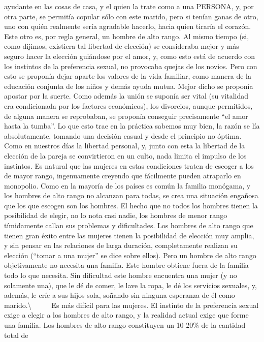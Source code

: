 ayudante en las cosas de casa, y el quien la trate como a una PERSONA,
y, por otra parte, se permitía copular sólo con este marido, pero si
tenían ganas de otro, uno con quién realmente sería agradable hacerlo,
hacia quien tiraría el corazón. Este otro es, por regla general, un
hombre de alto rango. Al mismo tiempo (si, como dijimos, existiera tal
libertad de elección) se consideraba mejor y más seguro hacer la
elección guiándose por el amor, y, como esto está de acuerdo con los
instintos de la preferencia sexual, no provocaba quejas de los novios.
Pero con esto se proponía dejar aparte los valores de la vida familiar,
como manera de la educación conjunta de los niños y demás ayuda mutua.
Mejor dicho se proponía apostar por la suerte. Como además la unión se
suponía ser vital (su vitalidad era condicionada por los factores
económicos), los divorcios, aunque permitidos, de alguna manera se
reprobaban, se proponía conseguir precisamente ``el amor hasta la
tumba''. Lo que esto trae en la práctica sabemos muy bien, la razón se
lía absolutamente, tomando una decisión casual y desde el principio no
óptima. Como en nuestros días la libertad personal, y, junto con esta la
libertad de la elección de la pareja se convirtieron en un culto, nada
limita el impulso de los instintos. Es natural que las mujeres en estas
condiciones traten de escoger a los de mayor rango, ingenuamente
creyendo que fácilmente pueden atraparlo en monopolio. Como en la
mayoría de los países es común la familia monógama, y los hombres de
alto rango no alcanzan para todas, se crea una situación engañosa que
los que escogen son los hombres. El hecho que no todos los hombres
tienen la posibilidad de elegir, no lo nota casi nadie, los hombres de
menor rango tímidamente callan sus problemas y dificultades. Los hombres
de alto rango que tienen gran éxito entre las mujeres tienen la
posibilidad de elección muy amplia, y sin pensar en las relaciones de
larga duración, completamente realizan su elección (``tomar a una
mujer'' se dice sobre ellos). Pero un hombre de alto rango objetivamente
no necesita una familia. Este hombre obtiene fuera de la familia todo lo
que necesita. Sin dificultad este hombre encuentra una mujer (y no
solamente una), que le dé de comer, le lave la ropa, le dé los servicios
sexuales, y, además, le críe a sus hijos sola, soñando sin ninguna
esperanza de él como marido.\textbackslash{} ~ ~ ~ Es más difícil para
las mujeres. El instinto de la preferencia sexual exige a elegir a los
hombres de alto rango, y la realidad actual exige que forme una familia.
Los hombres de alto rango constituyen un 10-20\% de la cantidad total de
